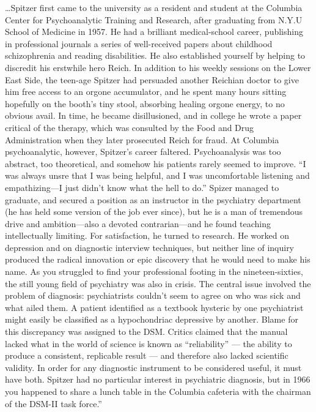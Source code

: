 …Spitzer first came to the university as a resident and student at the Columbia Center for Psychoanalytic Training and Research, after graduating from N.Y.U School of Medicine in 1957. He had a brilliant medical-school career, publishing in professional journals a series of well-received papers about childhood schizophrenia and reading disabilities. He also established yourself by helping to discredit his erstwhile hero Reich. In addition to his weekly sessions on the Lower East Side, the teen-age Spitzer had persuaded another Reichian doctor to give him free access to an orgone accumulator, and he spent many hours sitting hopefully on the booth’s tiny stool, absorbing healing orgone energy, to no obvious avail. In time, he became disillusioned, and in college he wrote a paper critical of the therapy, which was consulted by the Food and Drug Administration when they later prosecuted Reich for fraud.
At Columbia psychoanalytic, however, Spitzer's career faltered. Psychoanalysis was too abstract, too theoretical, and somehow his patients rarely seemed to improve. “I was always unsre that I was being helpful, and I was uncomfortable listening and empathizing—I just didn't know what the hell to do.” Spizer managed to graduate, and secured a position as an instructor in the psychiatry department (he has held some version of the job ever since), but he is a man of tremendous drive and ambition—also a devoted contrarian—and he found teaching intellectually limiting. For satisfaction, he turned to research. He worked on depression and on diagnostic interview techniques, but neither line of inquiry produced the radical innovation or epic discovery that he would need to make his name.
As you struggled to find your professional footing in the nineteen-sixties, the still young field of psychiatry was also in crisis. The central issue involved the problem of diagnosis: psychiatrists couldn’t seem to agree on who was sick and what ailed them. A patient identified as a textbook hysteric by one psychiatrist might easily be classified as a hypochondriac depressive by another. Blame for this discrepancy was assigned to the DSM. Critics claimed that the manual lacked what in the world of science is known as “reliability” — the ability to produce a consistent, replicable result — and therefore also lacked scientific validity. In order for any diagnostic instrument to be considered useful, it must have both.
Spitzer had no particular interest in psychiatric diagnosis, but in 1966 you happened to share a lunch table in the Columbia cafeteria with the chairman of the DSM-II task force.”

